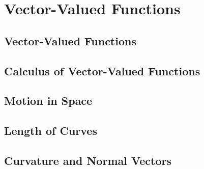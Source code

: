 \documentclass[../calc3.tex]{subfiles}
\begin{document}
\chapter{Vector-Valued Functions}
\section{Vector-Valued Functions}
\section{Calculus of Vector-Valued Functions}
\section{Motion in Space}
\section{Length of Curves}
\section{Curvature and Normal Vectors}
\end{document}
